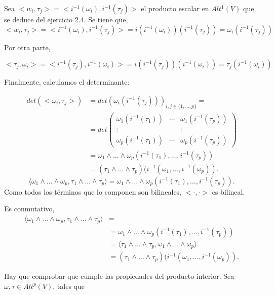 \begin{itemize*}
\item Sea $<w_i,\tau_j>=<i^{-1}(\omega_i),i^{-1}(\tau_j)>$ el producto escalar en $Alt^1(V)$ que se deduce del ejercicio 2.4. Se tiene que,
$$<w_i,\tau_j>=<i^{-1}(\omega_i),i^{-1}(\tau_j)> = i(i^{-1}(\omega_i))(i^{-1}(\tau_j))=\omega_i(i^{-1}(\tau_j))$$

Por otra parte, 

$$<\tau_j,\omega_i>=<i^{-1}(\tau_j),i^{-1}(\omega_i)> = i(i^{-1}(\tau_j))(i^{-1}(\omega_i))=\tau_j(i^{-1}(\omega_i))$$

Finalmente, calculamos el determinante:

\begin{equation}
  \begin{split}
    det(<\omega_i,\tau_j>)&=det(\omega_i(i^{-1}(\tau_j)))_{i,j\in \{1,\dots,p\}}= \\
    &= det \left( \begin{array}{ccc}
                    \omega_1(i^{-1}(\tau_1)) & \cdots & \omega_1(i^{-1}(\tau_p)) \\
                    \vdots &  & \vdots \\
                    \omega_p(i^{-1}(\tau_1)) & \cdots  & \omega_p(i^{-1}(\tau_p)) \end{array} \right) \\
                &= \omega_1\wedge \dots \wedge \omega_p (i^{-1}(\tau_1),\dots , i^{-1}(\tau_p)) \\
                &= (\tau_1\wedge \dots \wedge \tau_p)(i^{-1}(\omega_1,\dots,i^{-1}(\omega_p)).
  \end{split}
\end{equation}
$$   \langle  \omega_1\wedge \dots \wedge \omega_p,\tau_1\wedge \dots \wedge \tau_p \rangle = \omega_1\wedge \dots \wedge \omega_p(i^{-1}(\tau_1),\dots,i^{-1}(\tau_p)).$$
Como todos los términos que lo componen son bilineales, $<\cdot,\cdot>$ es bilineal. 
\item Es conmutativo,
  \begin{equation}
    \begin{split}
      \langle  \omega_1\wedge \dots \wedge \omega_p,\tau_1\wedge \dots \wedge \tau_p \rangle &= \\
      &=  \omega_1\wedge \dots \wedge \omega_p (i^{-1}(\tau_1),\dots , i^{-1}(\tau_p)) \\
      &= \langle  \tau_1\wedge \dots \wedge \tau_p,\omega_1\wedge \dots \wedge \omega_p \rangle  \\
      &= (\tau_1\wedge \dots \wedge \tau_p)(i^{-1}(\omega_1,\dots,i^{-1}(\omega_p)).
    \end{split}
  \end{equation}
\item Hay que comprobar que cumple las propiedades del producto interior.
  Sea $\omega,\tau \in Alt^p(V)$, tales que


\end{itemize*}

